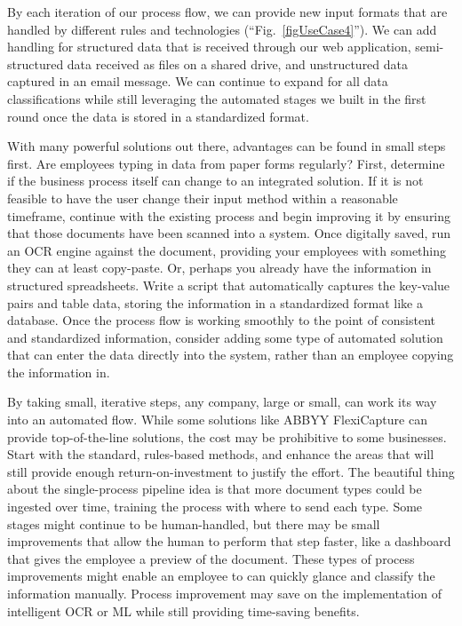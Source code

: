 \documentclass[conference]{IEEEtran}
\begin{document}
By each iteration of our process flow, we can provide new input formats that are handled by different rules and technologies (``Fig.~\ref{figUseCase4}''). We can add handling for structured data that is received through our web application, semi-structured data received as files on a shared drive, and unstructured data captured in an email message. We can continue to expand for all data classifications while still leveraging the automated stages we built in the first round once the data is stored in a standardized format.

With many powerful solutions out there, advantages can be found in small steps first. Are employees typing in data from paper forms regularly? First, determine if the business process itself can change to an integrated solution. If it is not feasible to have the user change their input method within a reasonable timeframe, continue with the existing process and begin improving it by ensuring that those documents have been scanned into a system. Once digitally saved, run an OCR engine against the document, providing your employees with something they can at least copy-paste. Or, perhaps you already have the information in structured spreadsheets. Write a script that automatically captures the key-value pairs and table data, storing the information in a standardized format like a database. Once the process flow is working smoothly to the point of consistent and standardized information, consider adding some type of automated solution that can enter the data directly into the system, rather than an employee copying the information in.

By taking small, iterative steps, any company, large or small, can work its way into an automated flow. While some solutions like ABBYY FlexiCapture can provide top-of-the-line solutions, the cost may be prohibitive to some businesses. Start with the standard, rules-based methods, and enhance the areas that will still provide enough return-on-investment to justify the effort. The beautiful thing about the single-process pipeline idea is that more document types could be ingested over time, training the process with where to send each type. Some stages might continue to be human-handled, but there may be small improvements that allow the human to perform that step faster, like a dashboard that gives the employee a preview of the document. These types of process improvements might enable an employee to can quickly glance and classify the information manually. Process improvement may save on the implementation of intelligent OCR or ML while still providing time-saving benefits.
\end{document}

